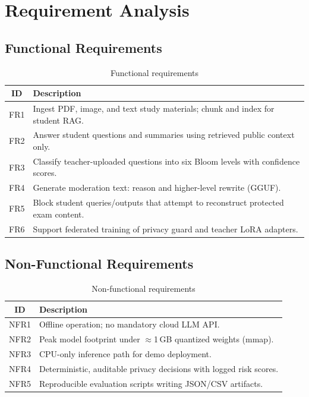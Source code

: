 
\section{Requirement Analysis}
\subsection{Functional Requirements}
\begin{table}[H]
\centering
\caption{Functional requirements}
\label{tab:fr}
\renewcommand{\arraystretch}{1.2}
\begin{tabular}{|c|p{11cm}|}
\hline
\textbf{ID} & \textbf{Description} \\
\hline
FR1 & Ingest PDF, image, and text study materials; chunk and index for student RAG. \\
\hline
FR2 & Answer student questions and summaries using retrieved public context only. \\
\hline
FR3 & Classify teacher-uploaded questions into six Bloom levels with confidence scores. \\
\hline
FR4 & Generate moderation text: reason and higher-level rewrite (GGUF). \\
\hline
FR5 & Block student queries/outputs that attempt to reconstruct protected exam content. \\
\hline
FR6 & Support federated training of privacy guard and teacher LoRA adapters. \\
\hline
\end{tabular}
\end{table}

\subsection{Non-Functional Requirements}
\begin{table}[H]
\centering
\caption{Non-functional requirements}
\label{tab:nfr}
\renewcommand{\arraystretch}{1.2}
\begin{tabular}{|c|p{11cm}|}
\hline
\textbf{ID} & \textbf{Description} \\
\hline
NFR1 & Offline operation; no mandatory cloud LLM API. \\
\hline
NFR2 & Peak model footprint under $\approx$1\,GB quantized weights (mmap). \\
\hline
NFR3 & CPU-only inference path for demo deployment. \\
\hline
NFR4 & Deterministic, auditable privacy decisions with logged risk scores. \\
\hline
NFR5 & Reproducible evaluation scripts writing JSON/CSV artifacts. \\
\hline
\end{tabular}
\end{table}

